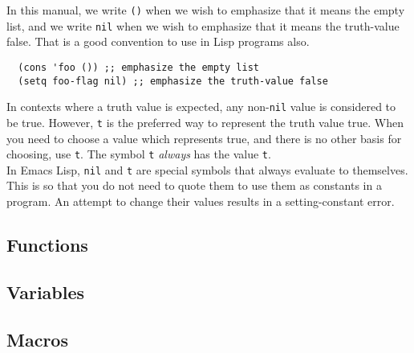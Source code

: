 \documentclass[12pt,a4paper,oneside]{article}
\begin{document}
In this manual, we write \texttt{()} when we wish to emphasize that it means the empty list, and we write \texttt{nil} when we wish to emphasize that it means the truth-value false. That is a good convention to use in Lisp programs also.

\begin{lstlisting}
  (cons 'foo ()) ;; emphasize the empty list
  (setq foo-flag nil) ;; emphasize the truth-value false
\end{lstlisting}   
     
In contexts where a truth value is expected, any non-\texttt{nil} value is considered to be true. However, \texttt{t} is the preferred way to represent the truth value true. When you need to choose a value which represents true, and there is no other basis for choosing, use \texttt{t}. The symbol \texttt{t} \emph{always} has the value \texttt{t}.\\

In Emacs Lisp, \texttt{nil} and \texttt{t} are special symbols that always evaluate to themselves. This is so that you do not need to quote them to use them as constants in a program. An attempt to change their values results in a setting-constant error.

\subsection{Functions}

\subsection{Variables}

\subsection{Macros}
\end{document}
